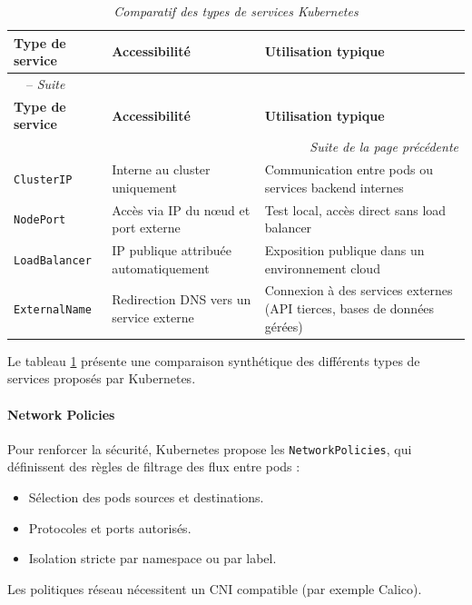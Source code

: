 \begin{longtable}{|p{4cm}|p{5cm}|p{6cm}|}
	\caption{\it{Comparatif des types de services Kubernetes}}
	\label{tab:services_k8s}                                                                                                                      \\ \hline
	\textbf{Type de service} & \textbf{Accessibilité}                  & \textbf{Utilisation typique}                                             \\ \hline
	\endfirsthead
	\multicolumn{3}{l}{\tablename\ \thetable\ -- \textit{Suite}}                                                                                  \\ \hline
	\textbf{Type de service} & \textbf{Accessibilité}                  & \textbf{Utilisation typique}                                             \\ \hline
	\endhead
	\hline \multicolumn{3}{r}{\textit{Suite de la page précédente}}                                                                               \\ \hline
	\endfoot
	\hline
	\endlastfoot

	\texttt{ClusterIP}       & Interne au cluster uniquement           & Communication entre pods ou services backend internes                    \\ \hline
	\texttt{NodePort}        & Accès via IP du nœud et port externe    & Test local, accès direct sans load balancer                              \\ \hline
	\texttt{LoadBalancer}    & IP publique attribuée automatiquement   & Exposition publique dans un environnement cloud                          \\ \hline
	\texttt{ExternalName}    & Redirection DNS vers un service externe & Connexion à des services externes (API tierces, bases de données gérées) \\ \hline

\end{longtable}
Le tableau \ref{tab:services_k8s} présente une comparaison synthétique des différents types de services proposés par Kubernetes.

\paragraph{Network Policies}

Pour renforcer la sécurité, Kubernetes propose les \texttt{NetworkPolicies}, qui définissent des règles de filtrage des flux entre pods :
\begin{itemize}
	\item Sélection des pods sources et destinations.
	\item Protocoles et ports autorisés.
	\item Isolation stricte par namespace ou par label.
\end{itemize}
Les politiques réseau nécessitent un CNI compatible (par exemple Calico).

